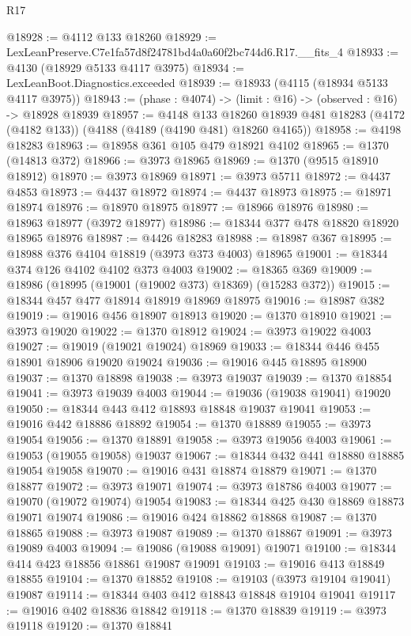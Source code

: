 \begin{lexlean}{R17}
\begin{coremodule}
@18928 := @4112 @133 @18260
@18929 := LexLeanPreserve.C7e1fa57d8f24781bd4a0a60f2bc744d6.R17.__fits_4
@18933 := @4130 (@18929 @5133 @4117 @3975)
@18934 := LexLeanBoot.Diagnostics.exceeded
@18939 := @18933 (@4115 (@18934 @5133 @4117 @3975))
@18943 := (phase : @4074) -> (limit : @16) -> (observed : @16) -> @18928 @18939
@18957 := @4148
    @133
    @18260
    @18939
    @481
    @18283
    (@4172 (@4182 @133))
    (@4188 (@4189 (@4190 @481) @18260 @4165))
@18958 := @4198 @18283
@18963 := @18958 @361 @105 @479 @18921 @4102
@18965 := @1370 (@14813 @372)
@18966 := @3973 @18965
@18969 := @1370 (@9515 @18910 @18912)
@18970 := @3973 @18969
@18971 := @3973 @5711
@18972 := @4437 @4853
@18973 := @4437 @18972
@18974 := @4437 @18973
@18975 := @18971 @18974
@18976 := @18970 @18975
@18977 := @18966 @18976
@18980 := @18963 @18977 (@3972 @18977)
@18986 := @18344 @377 @478 @18820 @18920 @18965 @18976
@18987 := @4426 @18283
@18988 := @18987 @367
@18995 := @18988 @376 @4104 @18819 (@3973 @373 @4003) @18965
@19001 := @18344 @374 @126 @4102 @4102 @373 @4003
@19002 := @18365 @369
@19009 := @18986 (@18995 (@19001 (@19002 @373) @18369) (@15283 @372))
@19015 := @18344 @457 @477 @18914 @18919 @18969 @18975
@19016 := @18987 @382
@19019 := @19016 @456 @18907 @18913
@19020 := @1370 @18910
@19021 := @3973 @19020
@19022 := @1370 @18912
@19024 := @3973 @19022 @4003
@19027 := @19019 (@19021 @19024) @18969
@19033 := @18344 @446 @455 @18901 @18906 @19020 @19024
@19036 := @19016 @445 @18895 @18900
@19037 := @1370 @18898
@19038 := @3973 @19037
@19039 := @1370 @18854
@19041 := @3973 @19039 @4003
@19044 := @19036 (@19038 @19041) @19020
@19050 := @18344 @443 @412 @18893 @18848 @19037 @19041
@19053 := @19016 @442 @18886 @18892
@19054 := @1370 @18889
@19055 := @3973 @19054
@19056 := @1370 @18891
@19058 := @3973 @19056 @4003
@19061 := @19053 (@19055 @19058) @19037
@19067 := @18344 @432 @441 @18880 @18885 @19054 @19058
@19070 := @19016 @431 @18874 @18879
@19071 := @1370 @18877
@19072 := @3973 @19071
@19074 := @3973 @18786 @4003
@19077 := @19070 (@19072 @19074) @19054
@19083 := @18344 @425 @430 @18869 @18873 @19071 @19074
@19086 := @19016 @424 @18862 @18868
@19087 := @1370 @18865
@19088 := @3973 @19087
@19089 := @1370 @18867
@19091 := @3973 @19089 @4003
@19094 := @19086 (@19088 @19091) @19071
@19100 := @18344 @414 @423 @18856 @18861 @19087 @19091
@19103 := @19016 @413 @18849 @18855
@19104 := @1370 @18852
@19108 := @19103 (@3973 @19104 @19041) @19087
@19114 := @18344 @403 @412 @18843 @18848 @19104 @19041
@19117 := @19016 @402 @18836 @18842
@19118 := @1370 @18839
@19119 := @3973 @19118
@19120 := @1370 @18841

\end{coremodule}
\end{lexlean}
